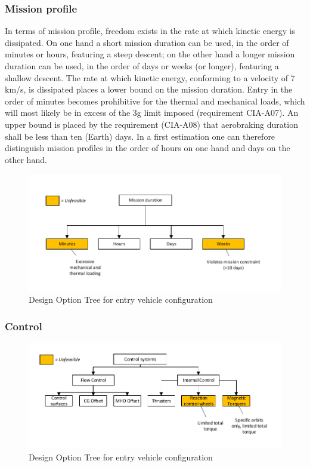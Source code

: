 \subsubsection{Mission profile} \label{sec:DOTprofile}
In terms of mission profile, freedom exists in the rate at which kinetic energy is dissipated. On one hand a short mission duration can be used, in the order of minutes or hours, featuring a steep descent; on the other hand a longer mission duration can be used, in the order of days or weeks (or longer), featuring a shallow descent. The rate at which kinetic energy, conforming to a velocity of 7 km/s, is dissipated places a lower bound on the mission duration. Entry in the order of minutes becomes prohibitive for the thermal and mechanical loads, which will most likely be in excess of the 3g limit imposed (requirement CIA-A07).  An upper bound is placed by the requirement (CIA-A08) that aerobraking duration shall be less than ten (Earth) days. In a first estimation one can therefore distinguish mission profiles in the order of hours on one hand and days on the other hand. 
\begin{figure}[H]
\centering
\includegraphics[width = 1.0\textwidth]{Figure/DOT_missionduration.pdf}
\vspace{-1cm}
\caption{Design Option Tree for entry vehicle configuration}
\label{fig:dotconfig}
\end{figure}

\subsubsection{Control} \label{sec:DOTcontrol}
\begin{figure}[H]
\centering
\includegraphics[width = 1.0\textwidth]{Figure/DOT_control.pdf}
\vspace{-1cm}
\caption{Design Option Tree for entry vehicle configuration}
\label{fig:dotconfig}
\end{figure}


